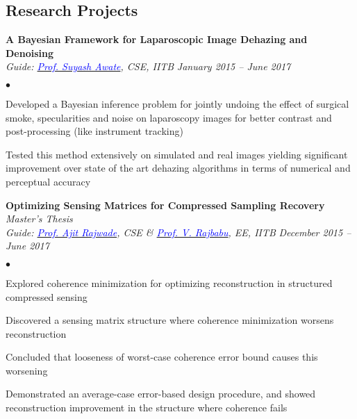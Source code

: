 \documentclass[margin,line]{res}
\newenvironment{list2}{
  \begin{list}{$\bullet$}{%
      \setlength{\itemsep}{0in}
      \setlength{\parsep}{0in} \setlength{\parskip}{0in}
      \setlength{\topsep}{0in} \setlength{\partopsep}{0in} 
      \setlength{\leftmargin}{0.18in}}}{\end{list}}
\begin{document}
\begin{resume}

\section{\sc Research Projects}

{\bf A Bayesian Framework for Laparoscopic Image Dehazing and Denoising} \\
{\em Guide: \href{https://www.cse.iitb.ac.in/~suyash}{\textcolor{blue}{Prof. Suyash Awate}}, CSE, IITB} \hfill {\it January 2015 -- June 2017} \\
\vspace*{-.13in}
\begin{list2}
\item Developed a Bayesian inference problem for jointly undoing the effect of surgical smoke, specularities and noise on laparoscopy images for better contrast and post-processing (like instrument tracking)
\item Tested this method extensively on simulated and real images yielding significant improvement over state of the art dehazing algorithms in terms of numerical and perceptual accuracy
\end{list2}

\vspace*{-0.13in}

{\bf Optimizing Sensing Matrices for Compressed Sampling Recovery} \hfill \textit{Master's Thesis} \\
{\em Guide: \href{https://www.cse.iitb.ac.in/~ajitvr}{\textcolor{blue}{Prof. Ajit Rajwade}}, CSE \& \href{https://www.ee.iitb.ac.in/wiki/faculty/rajbabu}{\textcolor{blue}{Prof. V. Rajbabu}}, EE, IITB} \hfill {\it December 2015 -- June 2017} \\
\vspace*{-.13in}
\begin{list2}
\item Explored coherence minimization for optimizing reconstruction in structured compressed sensing
\item Discovered a sensing matrix structure where coherence minimization worsens reconstruction
\item Concluded that looseness of worst-case coherence error bound causes this worsening 
\item Demonstrated an average-case error-based design procedure, and showed reconstruction improvement in the structure where coherence fails
\end{list2}


\end{resume}
\end{document}

